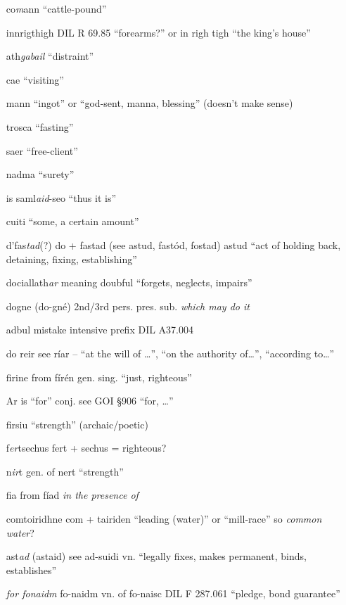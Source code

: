\documentclass[11pt]{article}
\begin{document}
\begin{enumerate}
  \item[co\emph{m}ann] \enquote{cattle-pound}
  \item[innrigthigh] DIL R 69.85 \enquote{forearms?} or in righ tigh \enquote{the king's house}
  \item[ath\emph{gabail}] \enquote{distraint}
  \item[cae] \enquote{visiting}
  \item[mann] \enquote{ingot} or \enquote{god-sent, manna, blessing} (doesn't make sense)
  \item[trosca] \enquote{fasting}
  \item[saer] \enquote{free-client}
  \item[nadma] \enquote{surety}
  \item[is saml\emph{aid}-seo] \enquote{thus it is}
  \item[cuiti] \enquote{some, a certain amount}
  \item[d'fas\emph{tad}(?)] do + fastad (see astud, fast\'{o}d, fostad) astud \enquote{act of holding back, detaining, fixing, establishing}
  \item[dociallath\emph{ar}] meaning doubful \enquote{forgets, neglects, impairs}
  \item[dogne] (do-gn\'{e}) 2nd/3rd pers. pres. sub. \emph{which may do it}
  \item[adbul] mistake intensive prefix DIL A37.004
  \item[do reir] see r\'{i}ar -- \enquote{at the will of \ldots}, \enquote{on the authority of\ldots}, \enquote{according to\ldots}
  \item[firine] from f\'{i}r\'{e}n gen. sing. \enquote{just, righteous}
  \item[Ar is] \enquote{for} conj. see GOI \S 906 \enquote{for, \ldots}
  \item[firsiu] \enquote{strength} (archaic/poetic)
  \item[f\emph{er}tsechus] fert + sechus = righteous?
  \item[n\emph{ir}t] gen. of nert \enquote{strength}
  \item[fia] from f\'{i}ad \emph{in the presence of}
  \item[comtoiridhne] com + tairiden \enquote{leading (water)} or \enquote{mill-race} so \emph{common water}?
  \item[ast\emph{ad}] (astaid) see ad-suidi vn. \enquote{legally fixes, makes permanent, binds, establishes}
  \item[\emph{f\emph{or} fonaidm}] fo-naidm vn. of fo-naisc DIL F 287.061 \enquote{pledge, bond guarantee} 

\end{enumerate}
\end{document}
